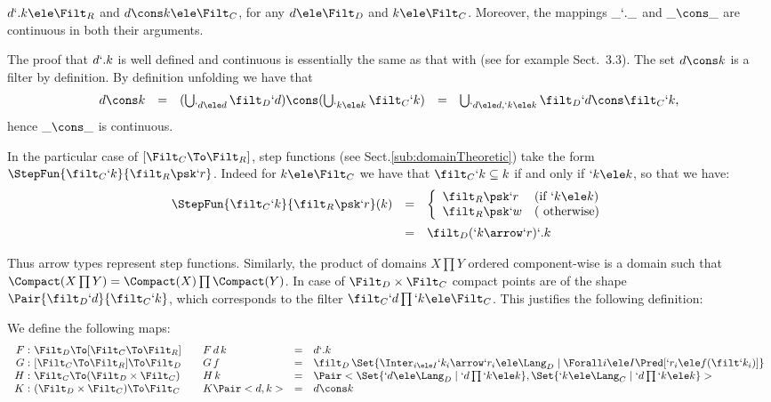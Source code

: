 \documentclass{lmcs}
\begin{document}
 \begin{lem} \label{lem:appConsCont}
$d`.k \ele \Filt_R$ and $d\cons k \ele \Filt_C$, for any $d \ele \Filt_D$ and $k \ele \Filt_C$. 
Moreover, the mappings
$\_ `.\_$ and $\_ \cons \_$ are continuous in both their arguments.
 \end{lem}

 \begin{Proof} The proof that $d`.k$ is well defined and continuous is essentially the same as that with {\EATS} (see for example \cite{Amadio-Curien'98} Sect.~3.3).
The set $d\cons k$ is a filter by definition. By definition unfolding we have that 
%
 \[ \begin{array}{rcl@{\quad}lc}
d\cons k 
	&=& 
(\bigcup_{`d \ele d} \filt_D `d) \cons (\bigcup_{`k \ele k } \filt_C `k) 
	&=& 
\bigcup_{`d \ele d,`k \ele k } \filt_D `d \cons \filt_C `k,
 \end{array} \]
hence $\_ \cons \_$ is continuous.
 \end{Proof}


In the particular case of $[\Filt_C\To\Filt_R]$, step functions (see Sect.\skp\ref{sub:domainTheoretic}) take the form $\StepFun{\filt_C `k }{ \filt_R \psk `r}$. 
Indeed for $k \ele \Filt_C$ we have that $\filt_C `k \subseteq k$ if and only if
$`k \ele k$, so that
we have:
%
 \[ \begin{array}{lll}
 \StepFun{\filt_C `k }{ \filt_R \psk `r} (k) & = &
 \left\{
 \begin{array}{ll}
 \filt_R\psk `r & (\textrm{if }`k \ele k ) \\
 \filt_R\psk `w & (\textrm{ otherwise})
 \end{array} \right. \\ [4mm]
& = &
 \filt_D(`k\arrow `r)`.k
 \end{array} \]


Thus arrow types represent step functions. Similarly, the product of domains $X\prod Y$ ordered component-wise is a domain such that $\Compact(X\prod Y) = \Compact(X)\prod \Compact(Y)$. 
In case of $\Filt_D \times \Filt_C$ compact points are of the shape $\Pair{\filt_D`d }{ \filt_C`k }$, which corresponds to 
the filter $\filt_C `d\prod `k \ele \Filt_C$.
This justifies the following definition:

 \begin{defi} \label{def:iso-maps}
We define the following maps:
%
 \[ \begin{array}{r@{~}l@{\qquad}lcl}
F:& \Filt_D \To [ \Filt_C\To\Filt_R] &
F \, d \, k &=& d `. k 
	\\
G:&[ \Filt_C\To\Filt_R] \To \Filt_D &
G \, f &=& \filt_D\,\Set{\Inter_{i \ele I} `k_i\arrow `r_i \ele \Lang_D \mid \Forall i \ele I \Pred[ `r_i \ele f(\filt `k_i) ] } 
	\\
H:& \Filt_C \To (\Filt_D \times \Filt_C) &
H \, k &=& \Pair< \Set{`d \ele \Lang_D \mid `d\prod `k \ele k } , \Set{`k \ele \Lang_C \mid `d\prod `k \ele k } >
	\\
K:&(\Filt_D \times \Filt_C) \To \Filt_C &
K \Pair<d,k> &=& d \cons k 
 \end{array} \]
 \end{defi}
\end{document}
